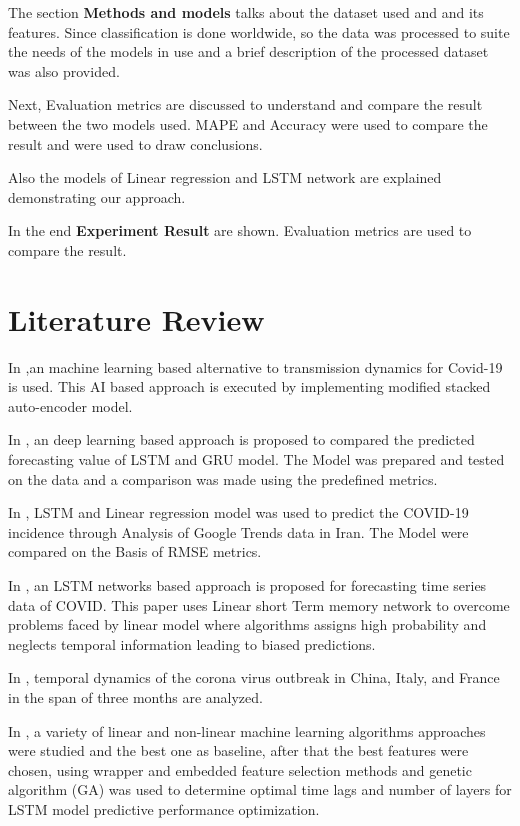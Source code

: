 The section \textbf{Methods and models} talks about the dataset used and and its
features. Since classification is done worldwide, so the data was processed to
suite the needs of the models in use and a brief description of the processed
dataset was also provided.

Next, Evaluation metrics are discussed to understand and compare the result
between the two models used. MAPE and Accuracy were used to compare the result
and were used to draw conclusions.

Also the models of Linear regression and LSTM network are explained
demonstrating our approach.

In the end \textbf{Experiment Result} are shown. Evaluation metrics are used
to compare the result.


\section{Literature Review}

In \cite{hu2020artificial},an machine learning based alternative to
transmission dynamics for Covid-19 is used. This AI based approach is executed by implementing modified stacked
auto-encoder model.

In \cite{bandyopadhyay2020machine}, an deep learning based approach is
proposed to compared the predicted forecasting value of LSTM and GRU model. The
Model was prepared and tested on the data and a comparison was made using the
predefined metrics.

In \cite{ayyoubzadeh2020predicting}, LSTM and Linear regression model was used
to predict the COVID-19 incidence through Analysis of Google Trends data in
Iran. The Model were compared on the Basis of RMSE metrics.

In \cite{chimmula2020time}, an LSTM networks based approach is proposed for
forecasting time series data of COVID.
This paper uses Linear short Term memory network to overcome problems faced by linear model where
algorithms assigns high probability and neglects temporal information leading to
biased predictions.

In \cite{fanelli2020analysis}, temporal dynamics of the corona virus outbreak
in China, Italy, and France in the span of three months are analyzed.

In \cite{bouktif2018optimal}, a variety of linear and non-linear machine
learning algorithms approaches were studied and the best one as baseline, after
that the best features were chosen, using wrapper and
embedded feature selection methods and genetic algorithm (GA) was used to
determine optimal time lags and number of layers for LSTM model predictive performance
optimization.

